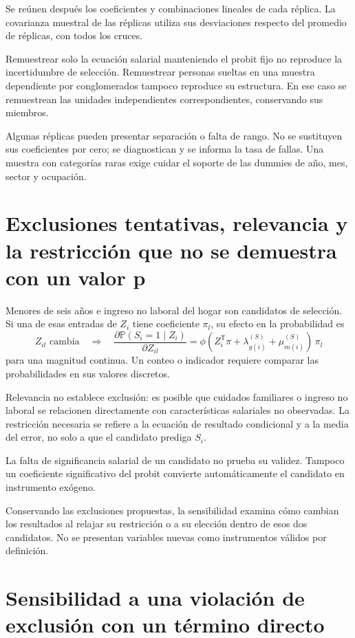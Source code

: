 \documentclass[11pt,a4paper]{article}
\newcommand{\Prob}{\mathbb P}
\begin{document}
Se reúnen después los coeficientes y combinaciones lineales de cada réplica. La covarianza muestral de las réplicas utiliza sus desviaciones respecto del promedio de réplicas, con todos los cruces.

Remuestrear solo la ecuación salarial manteniendo el probit fijo no reproduce la incertidumbre de selección. Remuestrear personas sueltas en una muestra dependiente por conglomerados tampoco reproduce su estructura. En ese caso se remuestrean las unidades independientes correspondientes, conservando sus miembros.

Algunas réplicas pueden presentar separación o falta de rango. No se sustituyen sus coeficientes por cero; se diagnostican y se informa la tasa de fallas. Una muestra con categorías raras exige cuidar el soporte de las dummies de año, mes, sector y ocupación.

\clearpage
\section{Exclusiones tentativas, relevancia y la restricción que no se demuestra con un valor p}

Menores de seis años e ingreso no laboral del hogar son candidatos de selección. Si una de esas entradas de $Z_i$ tiene coeficiente $\pi_l$, su efecto en la probabilidad es
\[
Z_{il}\text{ cambia}\quad\Longrightarrow\quad
\frac{\partial\Prob(S_i=1\mid Z_i)}{\partial Z_{il}}
=\phi(Z_i^{\mathsf T}\pi+\lambda_{y(i)}^{(S)}+\mu_{m(i)}^{(S)})\,\pi_l
\]
para una magnitud continua. Un conteo o indicador requiere comparar las probabilidades en sus valores discretos.

Relevancia no establece exclusión: es posible que cuidados familiares o ingreso no laboral se relacionen directamente con características salariales no observadas. La restricción necesaria se refiere a la ecuación de resultado condicional y a la media del error, no solo a que el candidato prediga $S_i$.

La falta de significancia salarial de un candidato no prueba su validez. Tampoco un coeficiente significativo del probit convierte automáticamente el candidato en instrumento exógeno.

Conservando las exclusiones propuestas, la sensibilidad examina cómo cambian los resultados al relajar su restricción o a su elección dentro de esos dos candidatos. No se presentan variables nuevas como instrumentos válidos por definición.

\clearpage
\section{Sensibilidad a una violación de exclusión con un término directo}
\end{document}
